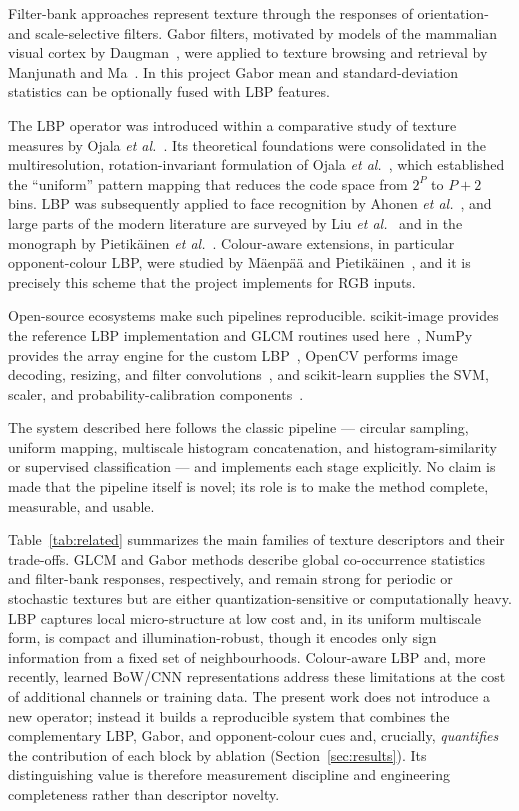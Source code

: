 \documentclass[conference]{IEEEtran}
\begin{document}
Filter-bank approaches represent texture through the responses of
orientation- and scale-selective filters. Gabor filters, motivated by
models of the mammalian visual cortex by Daugman~\cite{daugman1985}, were
applied to texture browsing and retrieval by Manjunath and Ma~\cite{manjunath1996}.
In this project Gabor mean and standard-deviation statistics can be
optionally fused with LBP features.

The LBP operator was introduced within a comparative study of texture
measures by Ojala \emph{et al.}~\cite{ojala1996comparative}. Its
theoretical foundations were consolidated in the multiresolution,
rotation-invariant formulation of Ojala \emph{et al.}~\cite{ojala2002multiresolution},
which established the ``uniform'' pattern mapping that reduces the code
space from $2^P$ to $P+2$ bins. LBP was subsequently applied to face
recognition by Ahonen \emph{et al.}~\cite{ahonen2006}, and large parts of
the modern literature are surveyed by Liu \emph{et al.}~\cite{liu2019bowcnn}
and in the monograph by Pietik\"{a}inen \emph{et al.}~\cite{pietikainen2011}.
Colour-aware extensions, in particular opponent-colour LBP, were studied by
M\"{a}enp\"{a}\"{a} and Pietik\"{a}inen~\cite{maenpaa2004}, and it is
precisely this scheme that the project implements for RGB inputs.

Open-source ecosystems make such pipelines reproducible. scikit-image
provides the reference LBP implementation and GLCM routines used here~\cite{van2014scikit},
NumPy provides the array engine for the custom LBP~\cite{numpy}, OpenCV
performs image decoding, resizing, and filter convolutions~\cite{opencv},
and scikit-learn supplies the SVM, scaler, and probability-calibration
components~\cite{pedregosa2011}.

The system described here follows the classic pipeline --- circular
sampling, uniform mapping, multiscale histogram concatenation, and
histogram-similarity or supervised classification --- and implements each
stage explicitly. No claim is made that the pipeline itself is novel; its
role is to make the method complete, measurable, and usable.

Table~\ref{tab:related} summarizes the main families of texture
descriptors and their trade-offs. GLCM and Gabor methods describe global
co-occurrence statistics and filter-bank responses, respectively, and
remain strong for periodic or stochastic textures but are either
quantization-sensitive or computationally heavy. LBP captures local
micro-structure at low cost and, in its uniform multiscale form, is compact
and illumination-robust, though it encodes only sign information from a
fixed set of neighbourhoods. Colour-aware LBP and, more recently, learned
BoW/CNN representations address these limitations at the cost of additional
channels or training data. The present work does not introduce a new
operator; instead it builds a reproducible system that combines the
complementary LBP, Gabor, and opponent-colour cues and, crucially,
\emph{quantifies} the contribution of each block by ablation
(Section~\ref{sec:results}). Its distinguishing value is therefore
measurement discipline and engineering completeness rather than descriptor
novelty.
\end{document}
